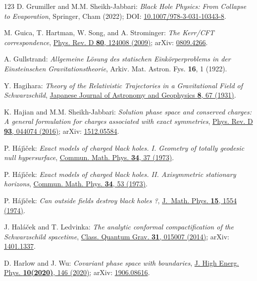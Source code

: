 \begin{thebibliography}{123}
D. Grumiller and M.M. Sheikh-Jabbari:
{\em Black Hole Physics: From Collapse to Evaporation},
Springer, Cham (2022);
DOI: \href{https://doi.org/10.1007/978-3-031-10343-8}{10.1007/978-3-031-10343-8}.

M. Guica, T. Hartman, W. Song, and A. Strominger:
{\em The Kerr/CFT correspondence},
\href{https://doi.org/10.1103/PhysRevD.80.124008}{Phys. Rev. D {\bf 80}, 124008 (2009)};
arXiv: \href{https://arxiv.org/abs/0809.4266}{0809.4266}.

A. Gullstrand:
\emph{Allgemeine Lösung des statischen Einkörperproblems in der Einsteinschen Gravitationstheorie},
Arkiv. Mat. Astron. Fys. {\bf 16}, 1 (1922).

Y. Hagihara:
\emph{Theory of the Relativistic Trajectories in a Gravitational Field of Schwarzschild},
\href{https://ui.adsabs.harvard.edu/abs/1930JaJAG...8...67H}{Japanese Journal of Astronomy and Geophysics {\bf 8}, 67 (1931)}.

K. Hajian and M.M. Sheikh-Jabbari:
{\em Solution phase space and conserved charges: A general formulation for charges associated with exact symmetries},
\href{https://doi.org/10.1103/PhysRevD.93.044074}{Phys. Rev. D {\bf 93}, 044074 (2016)};
arXiv: \href{https://arxiv.org/abs/1512.05584}{1512.05584}.

P. H\'aj\'{\i}\v{c}ek:
{\em Exact models of charged black holes. I. Geometry
of totally geodesic null hypersurface},
\href{https://doi.org/10.1007/BF01646541}{Commun. Math. Phys. {\bf 34}, 37 (1973)}.

P. H\'aj\'{\i}\v{c}ek:
{\em Exact models of charged black holes.
II. Axisymmetric stationary horizons},
\href{https://doi.org/10.1007/BF01646542}{Commun. Math. Phys. {\bf 34}, 53 (1973)}.

P. H\'aj\'{\i}\v{c}ek:
{\em Can outside fields destroy black holes ?},
\href{https://doi.org/10.1063/1.1666846}{J.~Math. Phys. {\bf 15}, 1554 (1974)}.

J. Hal\'a\v{c}ek and T. Ledvinka:
{\em The analytic conformal compactification of the Schwarzschild spacetime},
\href{https://doi.org/10.1088/0264-9381/31/1/015007}{Class. Quantum Grav. {\bf 31}, 015007 (2014)};
arXiv: \href{https://arxiv.org/abs/1401.1337}{1401.1337}.

D. Harlow and J. Wu:
{\em Covariant phase space with boundaries},
\href{https://doi.org/10.1007/JHEP10(2020)146}{J. High Energ. Phys. {\bf 10(2020)}, 146 (2020)};
arXiv: \href{https://arxiv.org/abs/1906.08616}{1906.08616}.


\end{thebibliography}
